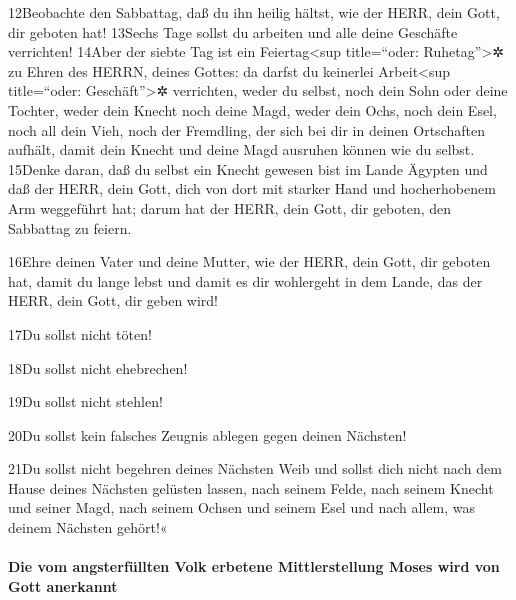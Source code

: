 12Beobachte den Sabbattag, daß du ihn heilig hältst, wie der HERR, dein
Gott, dir geboten hat! 13Sechs Tage sollst du arbeiten und alle deine
Geschäfte verrichten! 14Aber der siebte Tag ist ein
Feiertag\textless sup title=``oder: Ruhetag''\textgreater✲ zu Ehren des
HERRN, deines Gottes: da darfst du keinerlei Arbeit\textless sup
title=``oder: Geschäft''\textgreater✲ verrichten, weder du selbst, noch
dein Sohn oder deine Tochter, weder dein Knecht noch deine Magd, weder
dein Ochs, noch dein Esel, noch all dein Vieh, noch der Fremdling, der
sich bei dir in deinen Ortschaften aufhält, damit dein Knecht und deine
Magd ausruhen können wie du selbst. 15Denke daran, daß du selbst ein
Knecht gewesen bist im Lande Ägypten und daß der HERR, dein Gott, dich
von dort mit starker Hand und hocherhobenem Arm weggeführt hat; darum
hat der HERR, dein Gott, dir geboten, den Sabbattag zu feiern.

16Ehre deinen Vater und deine Mutter, wie der HERR, dein Gott, dir
geboten hat, damit du lange lebst und damit es dir wohlergeht in dem
Lande, das der HERR, dein Gott, dir geben wird!

17Du sollst nicht töten!

18Du sollst nicht ehebrechen!

19Du sollst nicht stehlen!

20Du sollst kein falsches Zeugnis ablegen gegen deinen Nächsten!

21Du sollst nicht begehren deines Nächsten Weib und sollst dich nicht
nach dem Hause deines Nächsten gelüsten lassen, nach seinem Felde, nach
seinem Knecht und seiner Magd, nach seinem Ochsen und seinem Esel und
nach allem, was deinem Nächsten gehört!«

\hypertarget{die-vom-angsterfuxfcllten-volk-erbetene-mittlerstellung-moses-wird-von-gott-anerkannt}{%
\paragraph{Die vom angsterfüllten Volk erbetene Mittlerstellung Moses
wird von Gott
anerkannt}\label{die-vom-angsterfuxfcllten-volk-erbetene-mittlerstellung-moses-wird-von-gott-anerkannt}}


